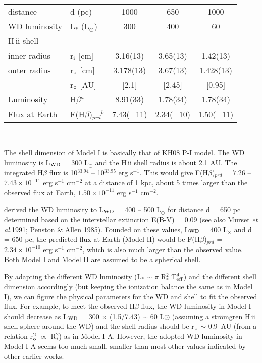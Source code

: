 \documentclass[a4paper,fleqn,usenatbib,useAMS]{mnras}
\def\etal{{\it et al.}}
\def\hb{H{$\beta$}}
\def\hii{H\,{\sc ii}}
\begin{document}
{\begin{table*}
\begin{tabular}{llccc}
\hline
distance  & d (pc) &    1000     &  650  & 1000   \\
WD luminosity  &  L$_*$ (L$_{\odot}$)  &  300  & 400 &   60   \\
\hline
{\hii} shell &      &       &  &    \\
inner radius  &    r$_{\rm i}$ [cm]  &  3.16(13)   & 3.65(13)  &  1.42(13)  \\
outer radius     &  r$_{\rm o}$ [cm]    &  3.178({13}) &  3.67(13) &  1.428(13)   \\
      &   r$_{\rm o}$ [AU]                     &   [2.1]  &  [2.45] &     [0.95]          \\
\hline
Luminosity  & {\hb}$^a$ &  8.91({33})   & 1.78(34) &    1.78(34) \\
Flux at Earth &  F({\hb})$_{prd}$$^b$  &  7.43($-$11)  & 2.34($-10$)  &  1.50($-11$)  \\
\hline

\end{tabular} \\
\label{tb4}
\end{table*}

The shell dimension of Model I is basically that of  KH08 P-I model. The WD luminosity is  L$_{\rm WD}$ = 300 L$_\odot$ and the  {\hii} shell radius is about 2.1 AU. The integrated {\hb} flux is 10$^{33.94}$ -- 10$^{33.95}$ erg s$^{-1}$.
This would give F({\hb})$_{prd}$ =  $7.26$ -- $7.43 \times 10^{-11}$ erg s$^{-1}$ cm$^{-2}$ at a distance of 1 kpc, about 5 times larger than the observed flux
at Earth,  $1.50 \times 10^{-11}$ erg s$^{-1}$ cm$^{-2}$.

\citet{vog94} derived the WD luminosity to L$_{\rm WD}$ = 400 -- 500 L$_{\odot}$ for  distance d = 650 pc determined based on the interstellar extinction E(B-V) = 0.09 (see also M{u}rset \etal 1991; Penston \& Allen 1985). Founded on these values,  L$_{\rm WD}$ = 400 L$_\odot$ and  d = 650 pc, the predicted flux at Earth (Model II) would be F({\hb})$_{prd}$ =  $2.34 \times 10^{-10}$ erg s$^{-1}$ cm$^{-2}$, which is also much larger than the observed value.
Both Model I and Model II are assumed to be a spherical shell.

By adapting the different WD luminosity (L$_*$ $\sim$ $\pi$ R$_*^2$ T$_{\rm eff}^4$) and the different shell dimension  accordingly (but keeping the ionization balance {the same} as in Model I), we can figure the physical parameters for the WD and shell to fit the observed flux. For example, to meet the observed {\hb} flux, the WD luminosity in Model I should decrease as L$_{\rm WD}$ = 300 $\times$ (1.5/7.43) $\sim$ 60 L$\odot$ (assuming a str\"{o}mgren {\hii} shell sphere around the WD) and the shell radius should be  r$_{\rm o}$ $\sim$ 0.9~AU  (from a relation r$_{\rm o}^2$ $\propto$ R$_*^2$) as in Model I-A. However, the adopted WD luminosity in Model I-A seems too much small, smaller than most other values indicated by other earlier works.

}
\end{document}
